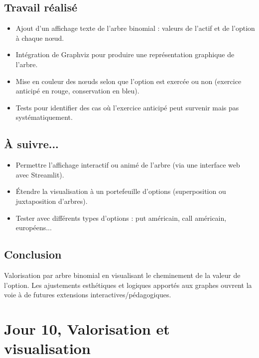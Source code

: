 \documentclass[a4paper,11pt]{article}
\begin{document}
\subsection{Travail réalisé}
\begin{itemize}
    \item Ajout d’un affichage texte de l’arbre binomial : valeurs de l’actif et de l’option à chaque nœud.
    \item Intégration de Graphviz pour produire une représentation graphique de l’arbre.
    \item Mise en couleur des nœuds selon que l’option est exercée ou non (exercice anticipé en rouge, conservation en bleu).
    \item Tests pour identifier des cas où l’exercice anticipé peut survenir mais pas systématiquement.
\end{itemize}

\subsection{À suivre...}
\begin{itemize}
    \item Permettre l'affichage interactif ou animé de l’arbre (via une interface web avec Streamlit).
    \item Étendre la visualisation à un portefeuille d’options (superposition ou juxtaposition d’arbres).
    \item Tester avec différents types d’options : put américain, call américain, européens...
\end{itemize}

\subsection{Conclusion}
Valorisation par arbre binomial en visualisant le cheminement de la valeur de l’option. Les ajustements esthétiques et logiques apportés aux graphes ouvrent la voie à de futures extensions interactives/pédagogiques.
\newpage


\section{Jour 10, Valorisation et visualisation}
\end{document}
